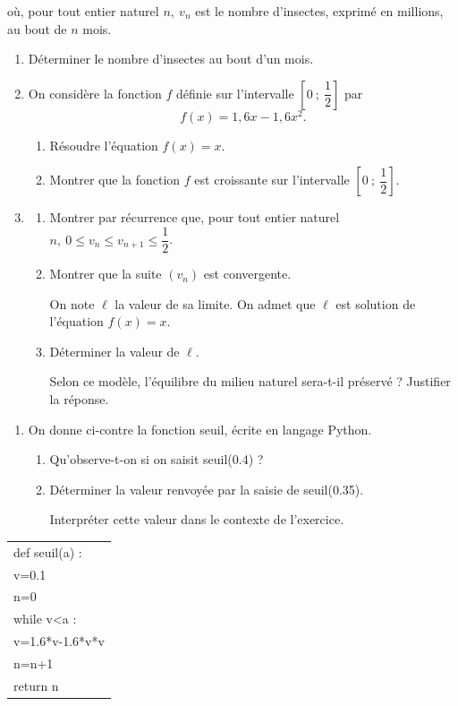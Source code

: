 où, pour tout entier naturel $n,\: v_n$ est le nombre d'insectes, exprimé en millions, au bout de $n$ mois.

\medskip

\begin{enumerate}
\item Déterminer le nombre d'insectes au bout d'un mois.
\item On considère la fonction $f$ définie sur l'intervalle $\left[0~;~\dfrac12\right]$ par
\[f(x) = 1,6x - 1,6x^2.\]

	\begin{enumerate}
		\item Résoudre l'équation $f(x) = x$.
		\item Montrer que la fonction $f$ est croissante sur l'intervalle $\left[0~;~\dfrac12\right]$.
	\end{enumerate}
\item 
	\begin{enumerate}
		\item Montrer par récurrence que, pour tout entier naturel $n,\: 0 \leqslant v_n  \leqslant  v_{n+1} \leqslant  \dfrac12$.
		\item Montrer que la suite $\left(v_n\right)$ est convergente.
		
On note $\ell$ la valeur de sa limite. On admet que $\ell$ est solution de l'équation $f(x) = x$.
		\item Déterminer la valeur de $\ell$. 
		
Selon ce modèle, l'équilibre du milieu naturel sera-t-il préservé ? Justifier la réponse.
	\end{enumerate}	
\end{enumerate}
\begin{minipage}{0.6\linewidth}
\begin{enumerate}[resume]
\item  On donne ci-contre la fonction seuil, écrite en langage Python.
	\begin{enumerate}
		\item Qu'observe-t-on si on saisit seuil(0.4) ?
		\item Déterminer la valeur renvoyée par la saisie de seuil(0.35).
		
Interpréter cette valeur dans le contexte de l'exercice.
	\end{enumerate}
\end{enumerate}	
\end{minipage}\hfill
\begin{minipage}{0.36\linewidth}
\begin{tabularx}{\linewidth}{|X|}\hline
def seuil(a) :\\
\qquad v=0.1\\
\qquad n=0\\
\qquad while v<a :\\
\qquad \qquad v=1.6*v-1.6*v*v\\
\qquad \qquad n=n+1\\
\qquad return n\\ \hline
\end{tabularx}
\end{minipage}

\bigskip
